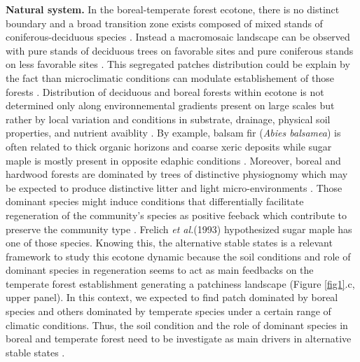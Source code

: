 \textbf{Natural system.} In the boreal-temperate forest ecotone, there is no
distinct boundary and a broad transition zone exists composed of mixed stands
of coniferous-deciduous species \cite{Goldblum2010}. Instead a macromosaic
landscape can be observed with pure stands of deciduous trees on favorable
sites and pure coniferous stands on less favorable sites \cite{Goldblum2010}.
This segregated patches distribution could be explain by the fact than
microclimatic conditions can modulate establishement of those forests
\cite{DeFrenne2013}. Distribution of deciduous and boreal forests within
ecotone is not determined only along environnemental gradients present on
large scales but rather by local variation and conditions in substrate,
drainage, physical soil properties, and nutrient avaiblity
\cite{Goldblum2010,Society2014}.  By example, balsam fir (\textit{Abies
balsamea}) is often related to thick organic horizons and coarse xeric
deposits while sugar maple is mostly present in opposite edaphic conditions
\cite{Messaoud2007,Kellman2004,Barras1998}. Moreover, boreal and hardwood
forests are dominated by trees of distinctive physiognomy which may be
expected to produce distinctive litter and light micro-environments
\cite{Barras1998}. Those dominant species might induce conditions that
differentially facilitate regeneration of the community’s species as positive
feeback which contribute to preserve the community type \cite{Barras1998}.
Frelich \textit{et al.}(1993) \cite{Society2014} hypothesized sugar maple has
one of those species.  Knowing this, the alternative stable states is a
relevant framework to study this ecotone dynamic because the soil conditions
and role of dominant species in regeneration seems to act as main feedbacks on
the temperate forest establishment generating a patchiness landscape (Figure
\ref{fig1}.c, upper panel). In this context, we expected to find patch
dominated by boreal species and others dominated by temperate species under a
certain range of climatic conditions. Thus, the soil condition and the role of
dominant species in boreal and temperate forest need to be investigate as main
drivers in alternative stable states
\cite{Kellman2004,Moore2008,DeFrenne2013,Barras1998}.


